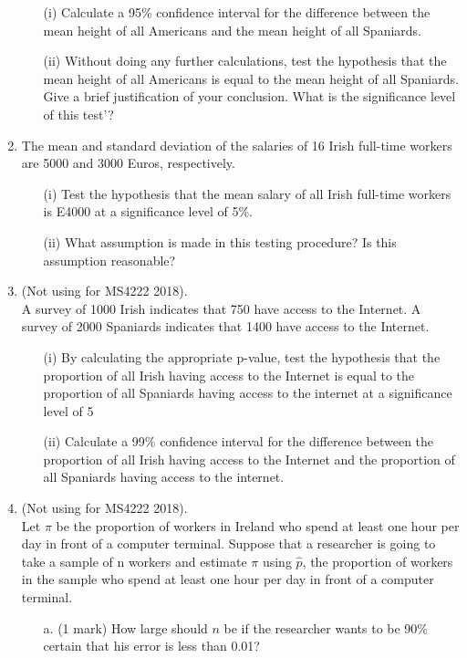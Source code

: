 \documentclass[]{article}
\begin{document}
\begin{enumerate}
\begin{itemize}
	\item[(i)]Calculate a 95\% confidence interval for the difference between the mean height
	of all Americans and the mean height of all Spaniards.
	
	
	\item[(ii)] Without doing any further calculations, test the hypothesis that the mean
	height of all Americans is equal to the mean height of all Spaniards. Give a brief
	justification of your conclusion. What is the significance level of this test'?
\end{itemize}

\item 
The mean and standard deviation of the salaries of 16 Irish full-time workers are 5000 and 3000 Euros, respectively.
\begin{itemize}
	\item[(i)] Test the hypothesis that the mean salary of all Irish full-time workers is E4000 at a significance level of 5\%.
	\item[(ii)] What assumption is made in this testing procedure? Is this assumption reasonable?
\end{itemize}

\item (Not using for MS4222 2018).\\
A survey of 1000 Irish indicates that 750 have access to the Internet. A survey of 2000 Spaniards
indicates that 1400 have access to the Internet.
\begin{itemize}
	\item[(i)]  By calculating the appropriate p-value, test the hypothesis that the proportion of all Irish
	having access to the Internet is equal to the proportion of all Spaniards having access to the
	internet at a significance level of 5%
	
	\item[(ii)] Calculate a 99\% confidence interval for the difference between the proportion of all Irish
	having access to the Internet and the proportion of all Spaniards having access to the
	internet.
\end{itemize}

\item (Not using for MS4222 2018).\\
Let $\pi$ be the proportion of workers in Ireland who spend at least one hour
per day in front of a computer terminal. Suppose that a researcher is going to take a
sample of n workers and estimate $\pi$ using $\hat{p}$, the proportion of workers in the sample
who spend at least one hour per day in front of a computer terminal.

\begin{itemize}
	\item[a.] (1 mark) How large
	should $n$ be if the researcher wants to be 90\% certain that his error is less than 0.01?
\end{itemize}
\end{enumerate}
\end{document}
